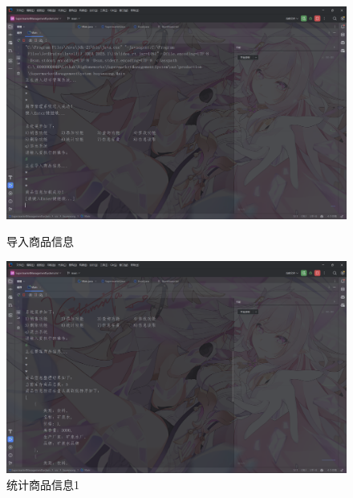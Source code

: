 \documentclass[12pt, a4paper, oneside]{ctexart}
\begin{document}
\begin{figure}[H]
    \begin{minipage}[t]{0.48\textwidth}
        \includegraphics[width=\textwidth]{../images/导入商品信息.png}
        \caption{导入商品信息}
    \end{minipage}
    \hfill
    \begin{minipage}[t]{0.48\textwidth}
        \includegraphics[width=\textwidth]{../images/统计商品信息1.png}
        \caption{统计商品信息1}
    \end{minipage}
\end{figure}
\end{document}
